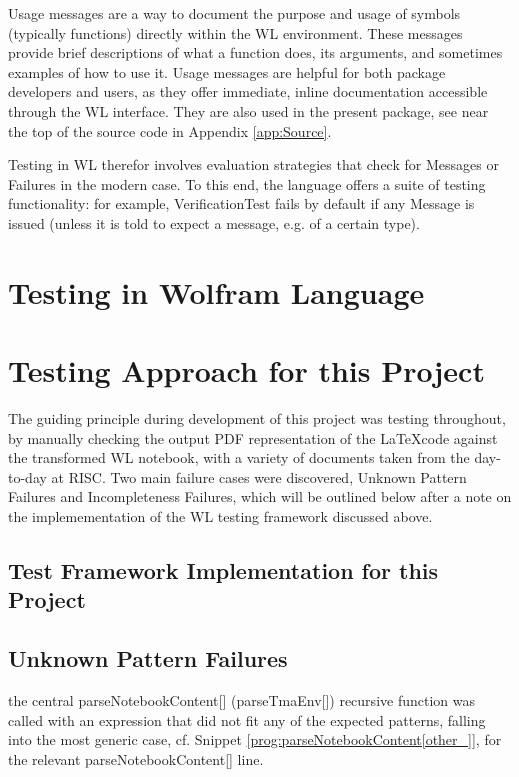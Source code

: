 Usage messages are a way to document the purpose and usage of symbols (typically functions) directly within the WL environment. These messages provide brief descriptions of what a function does, its arguments, and sometimes examples of how to use it. Usage messages are helpful for both package developers and users, as they offer immediate, inline documentation accessible through the WL interface. They are also used in the present package, see near the top of the source code in Appendix \ref{app:Source}.

Testing in WL therefor involves evaluation strategies that check for Messages or Failures in the modern case. To this end, the language offers a suite of testing functionality: for example, VerificationTest fails by default if any Message is issued (unless it is told to expect a message, e.g. of a certain type).

\section{Testing in Wolfram Language}


\section{Testing Approach for this Project}

 The guiding principle during development of this project was testing  throughout, by manually checking the output PDF representation of the \LaTeX code against the transformed WL notebook, with a variety of documents taken from the day-to-day at RISC. Two main failure cases were discovered, Unknown Pattern Failures and Incompleteness Failures, which will be outlined below after a note on the implemementation of the WL testing framework discussed above.

 \subsection{Test Framework Implementation for this Project}



 \subsection{Unknown Pattern Failures}

 the central parseNotebookContent[] (parseTmaEnv[]) recursive function was called with an expression that did not fit any of the expected patterns, falling into the most generic case, cf. Snippet \ref{prog:parseNotebookContent[other_]}, for the relevant parseNotebookContent[] line.

